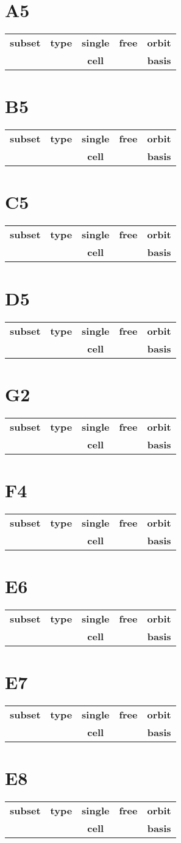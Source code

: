 \documentclass{article}
\newcommand{\resulttable}[1]{
  \section*{#1}
\begin{longtable}{llccc}
  \toprule
    \textbf{subset} & \textbf{type} & \textbf{single} & \textbf{free} & \textbf{orbit} \\
                  &               &   \textbf{cell}   &                & \textbf{basis} \\
  \midrule
  
  \bottomrule
\end{longtable}
}
\begin{document}
\resulttable{A5}\newpage
\resulttable{B5}\newpage
\resulttable{C5}\newpage
\resulttable{D5}\newpage
\resulttable{G2}
\resulttable{F4}\newpage
\resulttable{E6}\newpage
\resulttable{E7}\newpage
\resulttable{E8}
\end{document}
